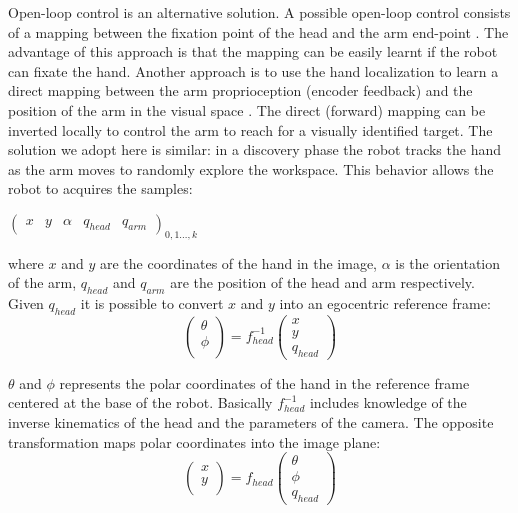 Open-loop control is an alternative solution. A possible open-loop
control consists of a mapping between the fixation point of the
head and the arm end-point \cite{metta00Babybot}. The advantage of
this approach is that the mapping can be easily learnt if the
robot can fixate the hand. Another approach is to use the hand
localization to learn a direct mapping between the arm
proprioception (encoder feedback) and the position of the arm in
the visual space \cite{natale05from}. The direct (forward) mapping
can be inverted locally to control the arm to reach for a visually
identified target. The solution we adopt here is similar: in a
discovery phase the robot tracks the hand as the arm moves to
randomly explore the workspace. This behavior allows the robot to
acquires the samples:

\begin{center}
\begin{math}
  \left(\begin{array}{ccccc}
    x & y & \alpha &q_{head} &q_{arm} \end{array}\right)_{0,1\dots,k}
\end{math}
\end{center}

where $x$ and $y$ are the coordinates of the hand in the image,
$\alpha$ is the orientation of the arm, $q_{head}$ and $q_{arm}$ are
the position of the head and arm respectively. Given $q_{head}$ it is
possible to convert $x$ and $y$ into an egocentric reference frame:
\begin{equation}
  \left(\begin{array}{c}
    \theta \\
    \phi \\
    \end{array}\right)
  = f_{head}^{-1}
  \left(\begin{array}{c}
    x \\
    y \\
    q_{head}
    \end{array} \right)
\label{eq-head-inverse}
\end{equation}

$\theta$ and $\phi$ represents the polar coordinates of the hand in the
reference frame centered at the base of the robot. Basically
$f_{head}^{-1}$ includes knowledge of the inverse kinematics of the
head and the parameters of the camera. The opposite transformation maps
polar coordinates into the image plane:
\begin{equation}
  \left(\begin{array}{c}
    x \\
    y \\
    \end{array}\right)
  = f_{head}
  \left(\begin{array}{c}
    \theta \\
    \phi \\
    q_{head}
    \end{array} \right)
\label{eq-head-direct}
\end{equation}

